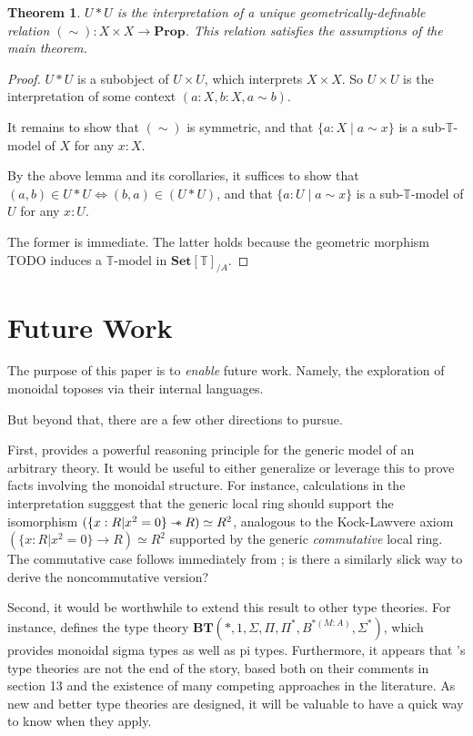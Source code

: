 \documentclass{article}
\newtheorem{theorem}{Theorem}[section]
\newcommand*{\Prop}{\mathbf{Prop}}
\newcommand*{\Set}{\mathbf{Set}}
\newcommand*{\T}{\mathbb{T}}
\newcommand*{\wand}{\mathbin{-\mkern-6mu*}}
\begin{document}
\begin{theorem}
    \(U * U\) is the interpretation of a unique geometrically-definable relation \((\sim) : X \times X \to \Prop\).
    This relation satisfies the assumptions of the main theorem.
\end{theorem}

\begin{proof}
    \(U * U\) is a subobject of \(U \times U\), which interprets \(X \times X\).
    So \(U \times U\) is the interpretation of some context \((a:X,b:X,a\sim b)\).

    It remains to show that \((\sim)\) is symmetric,
    and that \(\{a : X \mid a \sim x\}\) is a sub-\(\T\)-model of \(X\) for any \(x : X\).

    By the above lemma and its corollaries, it suffices to show that \((a,b) \in U*U \Leftrightarrow (b,a) \in (U*U)\),
    and that \(\{a : U \mid a \sim x\}\) is a sub-\(\T\)-model of \(U\) for any \(x : U\).

    The former is immediate. The latter holds because the geometric morphism TODO induces a \(\T\)-model in \(\Set[\T]_{/A}\).
\end{proof}

\section{Future Work}

The purpose of this paper is to \emph{enable} future work.
Namely, the exploration of monoidal toposes via their internal languages.

But beyond that, there are a few other directions to pursue.

First, \cite{blechschmidt} provides a powerful reasoning principle for the generic model of an arbitrary theory.
It would be useful to either generalize or leverage this to prove facts involving the monoidal structure.
For instance, calculations in the interpretation sugggest that the generic local ring should support
the isomorphism \((\{x : R | x^2 = 0\} \wand R) \simeq R^2\),
analogous to the Kock-Lawvere axiom \((\{x : R | x^2 = 0\} \to R) \simeq R^2\)
supported by the generic \emph{commutative} local ring.
The commutative case follows immediately from \cite[Theorem 4.10]{blechschmidt};
is there a similarly slick way to derive the noncommutative version?

Second, it would be worthwhile to extend this result to other type theories.
For instance, \cite{schopp} defines the type theory
\(\mathbf{BT}(*, 1, \Sigma, \Pi, \Pi^*, B^{*(M:A)}, \Sigma^*)\),
which provides monoidal sigma types as well as pi types.
Furthermore, it appears that \cite{schopp}'s type theories are not the end of the story,
based both on their comments in section 13 and the existence of many competing approaches in the literature.
As new and better type theories are designed, it will be valuable to have a quick way to know when they apply.

\end{document}
